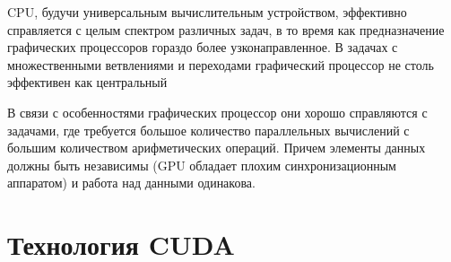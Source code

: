 \documentclass[a4paper,14pt,russian]{extreport}
\begin{document}
\par 
CPU, будучи универсальным вычислительным устройством, эффективно справляется с целым спектром различных задач, в то время как предназначение графических процессоров гораздо более узконаправленное. В задачах с множественными ветвлениями и переходами графический процессор не столь эффективен как центральный
\par
В связи с особенностями графических процессор они хорошо справляются с задачами, где требуется большое количество параллельных вычислений с большим количеством арифметических операций. Причем элементы данных должны быть независимы (GPU обладает плохим синхронизационным аппаратом) и работа над данными одинакова. 

\section{Технология CUDA}
\end{document}
